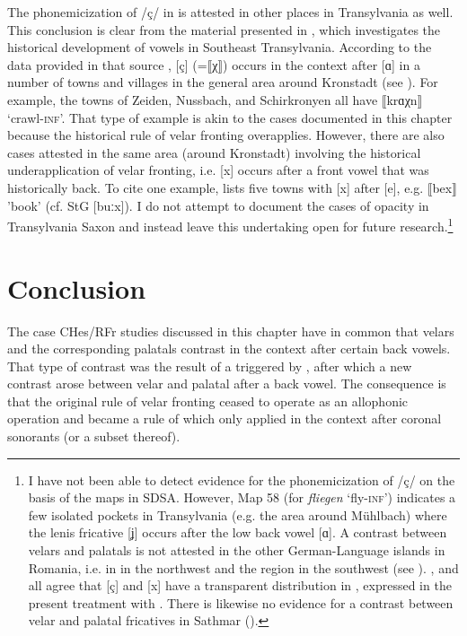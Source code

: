 \begin{sloppypar}
The phonemicization of /ç/ in  is attested in other places in Transylvania as well. This conclusion is clear from the material presented in \citet{Scheiner1922}, which investigates the historical development of vowels in Southeast Transylvania. According to the data provided in that source \citep[61, 63]{Scheiner1922}, [ç] (=⟦χ⟧) occurs in the context after [ɑ] in a number of towns and villages in the general area around Kronstadt (see ). For example, the towns of Zeiden, Nussbach, and Schirkronyen all have ⟦krɑχn⟧  ‘crawl-\textsc{inf}’. That type of example is akin to the cases documented in this chapter because the historical rule of velar fronting overapplies. However, there are also cases attested in the same area (around Kronstadt) involving the historical underapplication of velar fronting, i.e. [x] occurs after a front vowel that was historically back. To cite one example, \citet[61]{Scheiner1922} lists five towns with [x] after [e], e.g. ⟦bex⟧ 'book’ (cf. StG [buːx]). I do not attempt to document the cases of opacity in Transylvania Saxon and instead leave this undertaking open for future research.\footnote{I have not been able to detect evidence for the phonemicization of /ç/ on the basis of the maps in SDSA. However, Map 58 (for \textit{fliegen} ‘fly-\textsc{inf}') indicates a few isolated pockets in Transylvania (e.g. the area around Mühlbach) where the lenis fricative [ʝ] occurs after the low back vowel [ɑ]. A contrast between velars and palatals is not attested in the other German-Language islands in Romania, i.e. in  in the northwest and the  region in the southwest (see ). \citet{Barba1982, Wolf1987, Dama1991}, and \citet{Mileck1997} all agree that [ç] and [x] have a transparent distribution in , expressed in the present treatment  with . There is likewise no evidence for a contrast between velar and palatal fricatives in Sathmar (\citealt{Moser1937}).}
\end{sloppypar}

\section{Conclusion}\label{sec:9.6}

The case CHes/RFr studies discussed in this chapter have in common that velars and the corresponding palatals contrast in the context after certain back vowels. That type of contrast was the result of a  triggered by , after which a new contrast arose between velar and palatal after a back vowel. The consequence is that the original rule of velar fronting ceased to operate as an allophonic operation and became a rule of  which only applied in the context after coronal sonorants (or a subset thereof).

